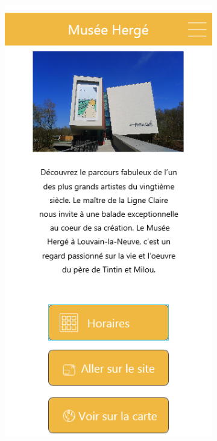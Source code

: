 \documentclass{eplmastersthesis}
\begin{document}
\begin{figure}[H]
\begin{subfigure}[b]{0.3\textwidth}
        \includegraphics[width=\textwidth]{Images/InVision/detail-musee.png}
    \end{subfigure}
    ~ %

\end{figure}
\end{document}
